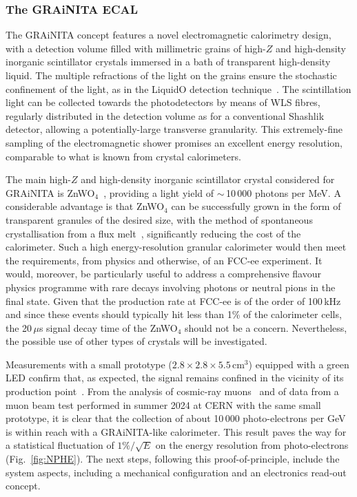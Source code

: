 \subsubsection{The GRAiNITA ECAL}

The GRAiNITA concept features a novel electromagnetic calorimetry design,
with a detection volume filled with millimetric grains of high-$Z$ and high-density inorganic scintillator crystals 
immersed in a bath of transparent high-density liquid. 
The multiple refractions of the light on the grains ensure the stochastic confinement of the light, 
as in the LiquidO detection technique~\cite{LiquidO:2019mxd}. 
The scintillation light can be collected towards the photodetectors by means of WLS fibres, 
regularly distributed in the detection volume as for a conventional Shashlik detector, 
allowing a potentially-large transverse granularity. 
This extremely-fine sampling of the electromagnetic shower promises an excellent energy resolution,
comparable to what is known from crystal calorimeters.

The main high-$Z$ and high-density inorganic scintillator crystal considered for GRAiNITA is ZnWO$_4$~\cite{bib:IEEE2022}, 
providing a light yield of $\sim$\,10\,000 photons per MeV. 
A considerable advantage is that ZnWO$_4$ can be successfully grown in the form of transparent granules of the desired size, 
with the method of spontaneous crystallisation from a flux melt~\cite{bib:IEEE2022}, significantly reducing the cost of the calorimeter. 
Such a high energy-resolution granular calorimeter would then meet the requirements,
from physics and otherwise, of an FCC-ee experiment. 
It would, moreover, be particularly useful to address a comprehensive flavour physics programme 
with rare decays involving photons or neutral pions in the final state. 
Given that the \PZ production rate at FCC-ee is of the order of 100\,kHz
and since these events should typically hit less than 1\% of the calorimeter cells, 
the 20\,$\mu$s signal decay time of the ZnWO$_4$ should not be a concern. 
Nevertheless, the possible use of other types of crystals will be investigated. 

Measurements with a small prototype ($2.8 \times 2.8 \times 5.5$\,cm$^3$) equipped with a green LED confirm that, as expected, 
the signal remains confined in the vicinity of its production point~\cite{Barsuk_2024}. 
From the analysis of cosmic-ray muons~\cite{Barsuk_2024} and of data from a muon beam test performed in summer 2024 at CERN with the same small prototype, 
it is clear that the collection of about 10\,000 photo-electrons per GeV is within reach with a GRAiNITA-like calorimeter. 
This result paves the way for a statistical fluctuation of $1\%/\sqrt{E}$ on the energy resolution from photo-electrons (Fig.~\ref{fig:NPHE}). 
The next steps, following this proof-of-principle, include the system aspects, including a mechanical configuration and an electronics read-out concept.

